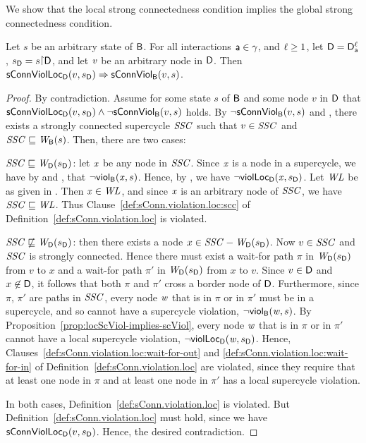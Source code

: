 We show that the local strong connectedness condition implies the global strong connectedness condition.

\begin{proposition}
\label{prop:locConnViol-implies-ConnViol}
 \label{prop:locConnViol-implies-connViol}
Let $s$ be an arbitrary state of $\B$.
For all interactions $\act \in \gamma$, and $\l \ge 1$, let $\DS = \dsks{\act}{\l}$, $\sD = s \pj \dsk{\act}{\l}$, and let $\ndv$ be an arbitrary node in $\dsk{\act}{\l}$.
Then\\
\ind $\locConnViol{v}{\sD}{\act}{\l} \imp \connViol{v}{s}$.
\end{proposition}
%
\begin{proof}
By contradiction. Assume for some state $s$ of $\B$ and some node $v$ in $\dsk{a}{\l}$ that $\locConnViol{v}{\sD}{\act}{\l} \land \neg
\connViol{v}{s}$ holds.
By $\neg \connViol{v}{s}$ and , there exists a strongly connected
supercycle $\SSC$ such that $v \in \SSC$ and $\SSC \subg \wfg{\B}{s}$. Then, there are two cases:
%
\bn
\item $\SSC \subg \wfg{\dsk{a}{\l}}{\sD}$: let $\ndx$ be any node in $\SSC$. Since $\ndx$ is a node in a supercycle, we have by
   and , that $\neg \scV{\ndx}{s}$. 
   Hence, by ,  we have $\neg \scVL{\ndx}{\sD}{\act}{\l}$. 
   Let $\WL$ be as given in .
  Then $\ndx \in \WL$, and since $\ndx$ is an arbitrary node of $\SSC$, we have $\SSC \subg \WL$. 
  Thus Clause~\ref{def:sConn.violation.loc:scc} of Definition~\ref{def:sConn.violation.loc} is violated.

\item $\SSC \not\subg \wfg{\dsk{a}{\l}}{\sD}$: then there exists a node $x \in \SSC - \wfg{\dsk{a}{\l}}{\sD}$.
  Now $v \in \SSC$ and $\SSC$ is strongly connected. Hence there must exist a wait-for path $\pi$ in $\lwfg{\B}{\sD}{\DS}$
  from $v$ to $x$ and a wait-for path $\pi'$ in $\lwfg{\B}{\sD}{\DS}$ from $x$ to
  $v$. Since $v \in \dsk{a}{\l}$ and $x \not\in \dsk{a}{\l}$, it
  follows that both $\pi$ and $\pi'$  cross a border node of
  $\dsk{a}{\l}$. Furthermore, since $\pi$, $\pi'$ are paths in $\SSC$, every node $\ndw$ that is
  in $\pi$ or in $\pi'$ must be in a supercycle, and so cannot have a supercycle violation, \ie $\neg \scV{\ndw}{s}$. 
  By Proposition~\ref{prop:locScViol-implies-scViol}, every node $\ndw$ that is
  in $\pi$ or in $\pi'$ cannot have a local supercycle violation, \ie $\neg \scVL{\ndw}{\sD}{\act}{\l}$.
  Hence, Clauses~\ref{def:sConn.violation.loc:wait-for-out} and
  \ref{def:sConn.violation.loc:wait-for-in} of Definition~\ref{def:sConn.violation.loc} are violated,
  since they require that at least one node in $\pi$ and at least one node in $\pi'$ has a local supercycle violation.
  
\en
In both cases,  Definition~\ref{def:sConn.violation.loc} is violated. 
But  Definition~\ref{def:sConn.violation.loc} must hold, since we have $\locConnViol{v}{\sD}{\act}{\l}$. 
Hence, the desired contradiction.
\end{proof}




